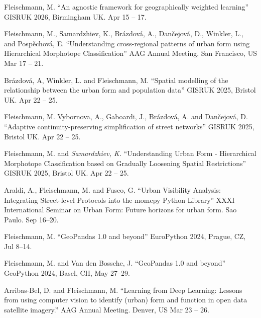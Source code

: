 \documentclass[12pt,a4paper]{report}
\begin{document}
    \begin{tablist}

        \item[2026] \tab{}Fleischmann, M. \enquote{An agnostic framework for geographically weighted learning} GISRUK 2026, Birmingham UK. Apr 15 -- 17.

        \item[2026] \tab{}Fleischmann, M., Samardzhiev, K., Brázdová, A., Dančejová, D., Winkler, L., and Pospěchová, E. \enquote{Understanding cross-regional patterns of urban form using Hierarchical Morphotope Classification} AAG Annual Meeting, San Francisco, US \@ Mar 17 -- 21.

        \item[2025] \tab{}Brázdová, A, Winkler, L. and Fleischmann, M. \enquote{Spatial modelling of the relationship between the urban form and population data} GISRUK 2025, Bristol UK. Apr 22 -- 25.

        \item[2025] \tab{}Fleischmann, M. Vybornova, A., Gaboardi, J., Brázdová, A. and Dančejová, D. \enquote{Adaptive continuity-preserving simplification of street networks} GISRUK 2025, Bristol UK. Apr 22 -- 25.

        \item[2025] \tab{}Fleischmann, M. and \textit{Samardzhiev, K.} \enquote{Understanding Urban Form - Hierarchical Morphotope Classification based on Gradually Loosening Spatial Restrictions} GISRUK 2025, Bristol UK. Apr 22 -- 25.

        \item[2024] \tab{}Araldi, A., Fleischmann, M. and Fusco, G. \enquote{Urban Visibility Analysis: Integrating Street-level Protocols into the momepy Python Library} XXXI International Seminar on Urban Form: Future horizons for urban form. Sao Paulo. \@ Sep 16--20.

        \item[2024] \tab{}Fleischmann, M. \enquote{GeoPandas 1.0 and beyond} EuroPython 2024, Prague, CZ,  \@ Jul 8--14.

        \item[2024] \tab{}Fleischmann, M. and Van den Bossche, J. \enquote{GeoPandas 1.0 and beyond} GeoPython 2024, Basel, CH,  \@ May 27--29.

        \item[2023] \tab{}Arribas-Bel, D. and Fleischmann, M. \enquote{Learning from Deep Learning: Lessons from using computer vision to identify (urban) form and function in open data satellite imagery.} AAG Annual Meeting. Denver, US \@ Mar 23 -- 26.


\end{tablist}
\end{document}
